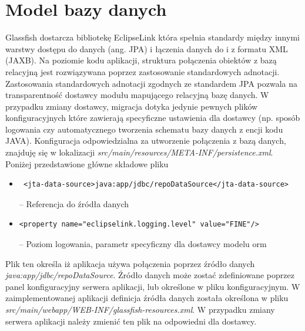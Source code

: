 \section{Model bazy danych}
Glassfish dostarcza bibliotekę EclipseLink która spełnia standardy między innymi warstwy dostępu do danych (ang. JPA) i łączenia danych do i z formatu XML (JAXB). Na poziomie kodu aplikacji, struktura połączenia obiektów z bazą relacyjną jest rozwiązywana poprzez zastosowanie standardowych adnotacji. Zastosowania standardowych adnotacji zgodnych ze standardem JPA pozwala na transparentność dostawcy modułu mapującego relacyjną bazę danych. W przypadku zmiany dostawcy, migracja dotyka jedynie pewnych plików konfiguracyjnych które zawierają specyficzne ustawienia dla dostawcy (np. sposób logowania czy automatycznego tworzenia schematu bazy danych z encji kodu JAVA).
Konfiguracja odpowiedzialna za utworzenie połączenia z bazą danych, znajduję się w lokalizacji \textit{src/main/resources/META-INF/persistence.xml}. Poniżej przedstawione główne składowe pliku

\begin{itemize}
	\item  {\footnotesize \begin{verbatim} <jta-data-source>java:app/jdbc/repoDataSource</jta-data-source> \end{verbatim}} -- Referencja do źródła danych
 	\item  {\footnotesize \begin{verbatim}<property name="eclipselink.logging.level" value="FINE"/>\end{verbatim}} -- Poziom logowania, parametr specyficzny dla dostawcy modelu orm
\end{itemize}


Plik ten określa iż aplikacja używa połączenia poprzez źródło danych \textit{java:app/jdbc/repoDataSource}. Źródło danych może zostać zdefiniowane poprzez panel konfiguracyjny serwera aplikacji, lub określone w pliku konfiguracyjnym. W zaimplementowanej aplikacji definicja źródła danych została określona w pliku \textit{src/main/webapp/WEB-INF/glassfish-resources.xml}. W przypadku zmiany serwera aplikacji należy zmienić ten plik na odpowiedni dla dostawcy.


